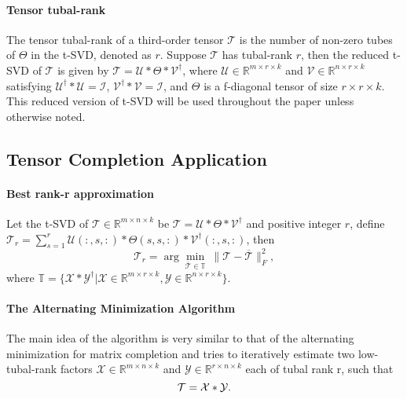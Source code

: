 \documentclass[format=acmsmall, review=false, screen=true]{acmart}
\begin{document}
\paragraph{Tensor tubal-rank} The tensor tubal-rank of a third-order
tensor $\mathcal{T} $ is the number of non-zero tubes of $\Theta$ in
the t-SVD, denoted as $r$.
Suppose $\mathcal{T}$ has tubal-rank $r$, then the
reduced t-SVD of $\mathcal{T}$ is given by $\mathcal{T} = \mathcal{U}
 * \Theta * \mathcal{V}^{\dagger}$, where $\mathcal{U} \in
 \mathbb{R}^{m \times r \times k}$ and $\mathcal{V} \in
 \mathbb{R}^{n \times r \times k}$ satisfying $\mathcal{U}^{\dagger} *
 \mathcal{U} = \mathcal{I}$, $\mathcal{V}^{\dagger} * \mathcal{V} =
 \mathcal{I}$, and $\Theta$ is a f-diagonal tensor of size $r \times r
 \times k$. This reduced version of t-SVD will be used throughout the
 paper unless otherwise noted.

\subsection{Tensor Completion Application}

\paragraph{Best rank-r approximation} Let the t-SVD of $\mathcal{T}
\in \mathbb{R}^{m \times n \times k}$ be $\mathcal{T} = \mathcal{U} *
 \Theta * \mathcal{V}^{\dagger}$ and positive integer $r$, define
$\mathcal{T}_{r} = \sum_{s = 1}^r \mathcal{U}(:, s, :) *
 \Theta(s, s, :) \ast \mathcal{V}^{\dagger}(:, s, :)$, then
\[
\mathcal{T}_r =
\arg \underset{\overline{ \mathcal{T}} \in \mathbb{T}} \min \ \| \mathcal{T} - \overline{
\mathcal{T}} \|_F^2 ,
\]
where $\mathbb{T} = \{\mathcal{X} \ast
\mathcal{Y}^{\dagger} | \mathcal{X} \in \mathbb{R}^{m \times r \times k},
\mathcal{Y} \in \mathbb{R}^{n \times r \times k}\}$.

\paragraph{The Alternating Minimization Algorithm}

The main idea of the algorithm is very similar to that of the alternating minimization for matrix completion  and tries to iteratively estimate two low-tubal-rank factors $\mathcal{X} \in \mathbb{R}^{m \times n \times k}$ and $\mathcal{Y} \in \mathbb{R}^{r \times n \times k}$ each of tubal rank r, such that
\[
    \mathcal{T} = \mathcal{X} * \mathcal{Y}. \notag
\]
\end{document}
